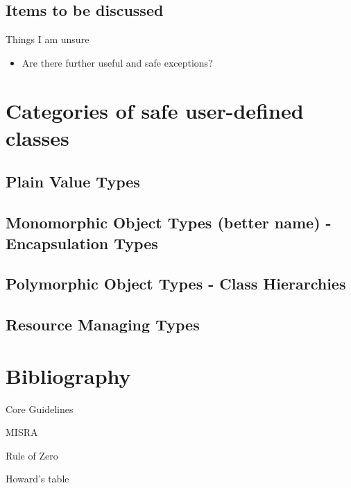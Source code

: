 \documentclass[ebook,11pt,article]{memoir}
\begin{document}
\section{Items to be discussed}
Things I am unsure
\begin{itemize}
\item Are there further useful and safe exceptions?
\end{itemize}


\chapter{Categories of safe user-defined classes}
\section{Plain Value Types}
\section{Monomorphic Object Types (better name) - Encapsulation Types}
\section{Polymorphic Object Types - Class Hierarchies}
\section{Resource Managing Types}


\chapter{Bibliography}
Core Guidelines

MISRA

Rule of Zero

Howard's table
\end{document}
